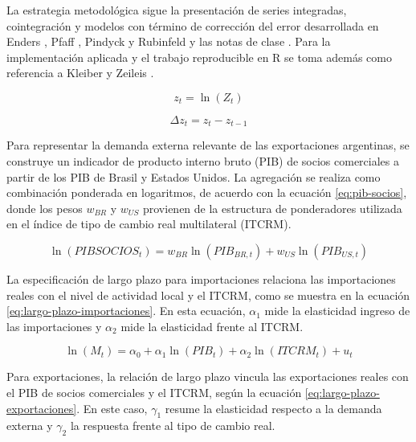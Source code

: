 \documentclass[11pt]{article}
\begin{document}
La estrategia metodológica sigue la presentación de series integradas,
cointegración y modelos con término de corrección del error desarrollada en
Enders \cite{enders_2014}, Pfaff \cite{pfaff_2008}, Pindyck y Rubinfeld
\cite{pindyck_rubinfeld_1998} y las notas de clase \cite{fabris_2025}. Para la
implementación aplicada y el trabajo reproducible en R se toma además como
referencia a Kleiber y Zeileis \cite{kleiber_zeileis_2008}.

\begin{equation}
z_t = \ln(Z_t)
\label{eq:transformacion-logaritmica}
\end{equation}

\begin{equation}
\Delta z_t = z_t - z_{t-1}
\label{eq:primera-diferencia-logaritmica}
\end{equation}

Para representar la demanda externa relevante de las exportaciones argentinas,
se construye un indicador de producto interno bruto (PIB) de socios comerciales
a partir de los PIB de Brasil y Estados Unidos. La agregación se realiza como
combinación ponderada en logaritmos, de acuerdo con la ecuación
\eqref{eq:pib-socios}, donde los pesos \(w_{BR}\) y \(w_{US}\) provienen de la
estructura de ponderadores utilizada en el índice de tipo de cambio real
multilateral (ITCRM).

\begin{equation}
\ln(PIBSOCIOS_t)
= w_{BR}\ln(PIB_{BR,t}) + w_{US}\ln(PIB_{US,t})
\label{eq:pib-socios}
\end{equation}

La especificación de largo plazo para importaciones relaciona las importaciones
reales con el nivel de actividad local y el ITCRM, como se muestra en la
ecuación \eqref{eq:largo-plazo-importaciones}. En esta ecuación, \(\alpha_1\)
mide la elasticidad ingreso de las importaciones y \(\alpha_2\) mide la
elasticidad frente al ITCRM.

\begin{equation}
\ln(M_t)
= \alpha_0 + \alpha_1 \ln(PIB_t) + \alpha_2 \ln(ITCRM_t) + u_t
\label{eq:largo-plazo-importaciones}
\end{equation}

Para exportaciones, la relación de largo plazo vincula las exportaciones reales
con el PIB de socios comerciales y el ITCRM, según la ecuación
\eqref{eq:largo-plazo-exportaciones}. En este caso, \(\gamma_1\) resume la
elasticidad respecto a la demanda externa y \(\gamma_2\) la respuesta frente al
tipo de cambio real.
\end{document}
